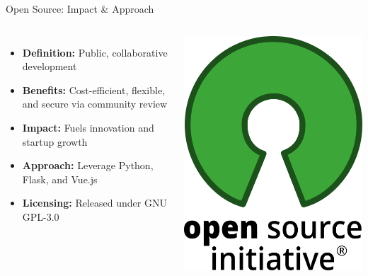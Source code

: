 \documentclass{beamer}
\begin{document}
\begin{frame}{Open Source: Impact \& Approach}
  \begin{columns}
      \begin{itemize}
        \item \textbf{Definition:} Public, collaborative development
        \item \textbf{Benefits:} Cost-efficient, flexible, and secure via community review
        \item \textbf{Impact:} Fuels innovation and startup growth
        \item \textbf{Approach:} Leverage Python, Flask, and Vue.js
        \item \textbf{Licensing:} Released under GNU GPL-3.0
      \end{itemize}
      \centering
      \includegraphics[width=\textwidth]{Open-Source.png} %
  \end{columns}
\end{frame}
\end{document}
